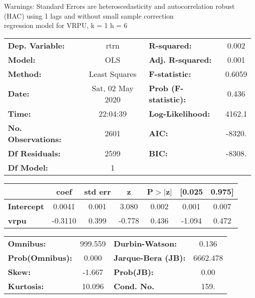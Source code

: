 Warnings: \newline
 [1] Standard Errors are heteroscedasticity and autocorrelation robust (HAC) using 1 lags and without small sample correction\\ 

regression model for VRPU, k = 1 h = 6\begin{center}
\begin{tabular}{lclc}
\toprule
\textbf{Dep. Variable:}    &       rtrn       & \textbf{  R-squared:         } &     0.002   \\
\textbf{Model:}            &       OLS        & \textbf{  Adj. R-squared:    } &     0.001   \\
\textbf{Method:}           &  Least Squares   & \textbf{  F-statistic:       } &    0.6059   \\
\textbf{Date:}             & Sat, 02 May 2020 & \textbf{  Prob (F-statistic):} &    0.436    \\
\textbf{Time:}             &     22:04:39     & \textbf{  Log-Likelihood:    } &    4162.1   \\
\textbf{No. Observations:} &        2601      & \textbf{  AIC:               } &    -8320.   \\
\textbf{Df Residuals:}     &        2599      & \textbf{  BIC:               } &    -8308.   \\
\textbf{Df Model:}         &           1      & \textbf{                     } &             \\
\bottomrule
\end{tabular}
\begin{tabular}{lcccccc}
                   & \textbf{coef} & \textbf{std err} & \textbf{z} & \textbf{P$> |$z$|$} & \textbf{[0.025} & \textbf{0.975]}  \\
\midrule
\textbf{Intercept} &       0.0041  &        0.001     &     3.080  &         0.002        &        0.001    &        0.007     \\
\textbf{vrpu}      &      -0.3110  &        0.399     &    -0.778  &         0.436        &       -1.094    &        0.472     \\
\bottomrule
\end{tabular}
\begin{tabular}{lclc}
\textbf{Omnibus:}       & 999.559 & \textbf{  Durbin-Watson:     } &    0.136  \\
\textbf{Prob(Omnibus):} &   0.000 & \textbf{  Jarque-Bera (JB):  } & 6662.478  \\
\textbf{Skew:}          &  -1.667 & \textbf{  Prob(JB):          } &     0.00  \\
\textbf{Kurtosis:}      &  10.096 & \textbf{  Cond. No.          } &     159.  \\
\bottomrule
\end{tabular}
\end{center}

